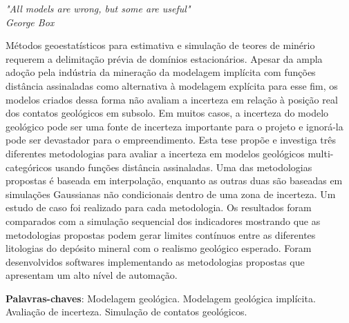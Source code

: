 \documentclass[
    oneside, %
	12pt,				%
	a4paper,			%
	chapter=TITLE,		%
	english,			%
	french,				%
	spanish,			%
	brazil				%
	]{abntex2}
\begin{document}
\begin{epigrafe}
    \vspace*{\fill}
	\begin{flushright}
		\textit{"All models are wrong, but some are useful"\\
		George Box}
	\end{flushright}
\end{epigrafe}


\setlength{\absparsep}{18pt} %
\begin{resumo}
    Métodos geoestatísticos para estimativa e simulação de teores de minério requerem a delimitação prévia de domínios estacionários. Apesar da ampla adoção pela indústria da mineração da modelagem implícita com funções distância assinaladas como alternativa à modelagem explícita para esse fim, os modelos criados dessa forma não avaliam a incerteza em relação à posição real dos contatos geológicos em subsolo. Em muitos casos, a incerteza do modelo geológico pode ser uma fonte de incerteza importante para o projeto e ignorá-la pode ser devastador para o empreendimento. Esta tese propõe e investiga três diferentes metodologias para avaliar a incerteza em modelos geológicos multi-categóricos usando funções distância assinaladas. Uma das metodologias propostas é baseada em interpolação, enquanto as outras duas são baseadas em simulações Gaussianas não condicionais dentro de uma zona de incerteza. Um estudo de caso foi realizado para cada metodologia. Os resultados foram comparados com a simulação sequencial dos indicadores mostrando que as metodologias propostas podem gerar limites contínuos entre as diferentes litologias do depósito mineral com o realismo geológico esperado. Foram desenvolvidos softwares implementando as metodologias propostas que apresentam um alto nível de automação.

 \textbf{Palavras-chaves}: Modelagem geológica. Modelagem geológica implícita. Avaliação de incerteza. Simulação de contatos geológicos.
\end{resumo}
\end{document}
